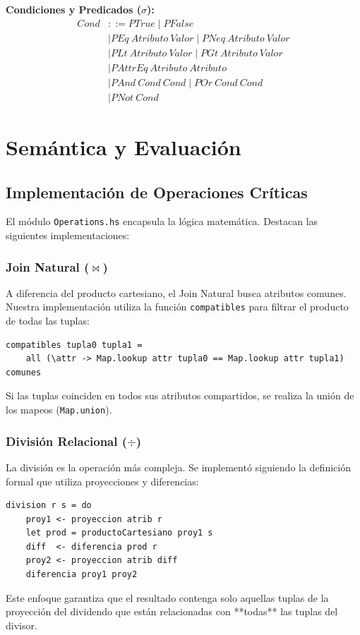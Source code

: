 \documentclass[12pt]{report}
\newcommand{\bnf}{::=}
\begin{document}
\vspace{0.3cm}
\textbf{Condiciones y Predicados ($\sigma$):}
\begin{align*}
Cond &\bnf PTrue \mid PFalse \\
     &\mid PEq\ Atributo\ Valor \mid PNeq\ Atributo\ Valor \\
     &\mid PLt\ Atributo\ Valor \mid PGt\ Atributo\ Valor \\
     &\mid PAttrEq\ Atributo\ Atributo \\
     &\mid PAnd\ Cond\ Cond \mid POr\ Cond\ Cond \\
     &\mid PNot\ Cond
\end{align*}

\chapter{Semántica y Evaluación}

\section{Implementación de Operaciones Críticas}
El módulo \texttt{Operations.hs} encapsula la lógica matemática. Destacan las siguientes implementaciones:

\subsection{Join Natural ($\bowtie$)}
A diferencia del producto cartesiano, el Join Natural busca atributos comunes. Nuestra implementación utiliza la función \texttt{compatibles} para filtrar el producto de todas las tuplas:
\begin{lstlisting}
compatibles tupla0 tupla1 =
    all (\attr -> Map.lookup attr tupla0 == Map.lookup attr tupla1) comunes
\end{lstlisting}
Si las tuplas coinciden en todos sus atributos compartidos, se realiza la unión de los mapeos (\texttt{Map.union}).

\subsection{División Relacional ($\div$)}
La división es la operación más compleja. Se implementó siguiendo la definición formal que utiliza proyecciones y diferencias:
\begin{lstlisting}
division r s = do
    proy1 <- proyeccion atrib r
    let prod = productoCartesiano proy1 s
    diff  <- diferencia prod r
    proy2 <- proyeccion atrib diff
    diferencia proy1 proy2
\end{lstlisting}
Este enfoque garantiza que el resultado contenga solo aquellas tuplas de la proyección del dividendo que están relacionadas con **todas** las tuplas del divisor.
\end{document}
